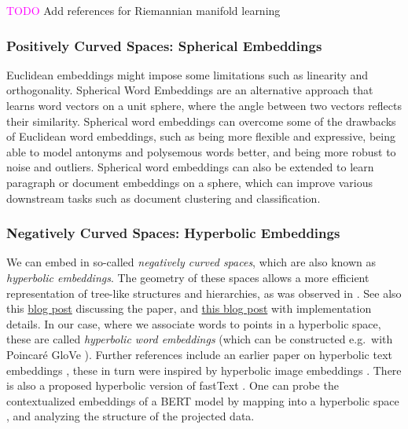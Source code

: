\documentclass[11pt, a4paper]{amsart}
\begin{document}
\textcolor{magenta}{TODO} Add references for Riemannian manifold learning

\subsubsection{Positively Curved Spaces: Spherical Embeddings}

Euclidean embeddings might impose some limitations such as linearity and orthogonality.
Spherical Word Embeddings \cite{Meng2019SphericalTE} are an alternative approach that learns word vectors on a unit sphere, where the angle between two vectors reflects their similarity.
Spherical word embeddings can overcome some of the drawbacks of Euclidean word embeddings, such as being more flexible and expressive, being able to model antonyms and polysemous words better, and being more robust to noise and outliers.
Spherical word embeddings can also be extended to learn paragraph or document embeddings on a sphere, which can improve various downstream tasks such as document clustering and classification.

\subsubsection{Negatively Curved Spaces: Hyperbolic Embeddings}

We can embed in so-called \emph{negatively curved spaces}, which are also known as \emph{hyperbolic embeddings}.
The geometry of these spaces allows a more efficient representation of tree-like structures and hierarchies, as was observed in \cite{DBLP:journals/corr/NickelK17}.
See also this \href{https://bjlkeng.github.io/posts/hyperbolic-geometry-and-poincare-embeddings/}{blog post} discussing the paper, and \href{https://rare-technologies.com/implementing-poincare-embeddings/}{this blog post} with implementation details.
In our case, where we associate words to points in a hyperbolic space, these are called \emph{hyperbolic word embeddings} (which can be constructed e.g.\ with Poincar{\'e} GloVe \cite{DBLP:journals/corr/abs-1810-06546}).
Further references include an earlier paper on hyperbolic text embeddings \cite{DBLP:journals/corr/abs-1806-04313},
these in turn were inspired by hyperbolic image embeddings \cite{DBLP:journals/corr/abs-1904-02239}.
There is also a proposed hyperbolic version of fastText \cite{zhu-etal-2020-hypertext}.
One can probe the contextualized embeddings of a BERT model by mapping into a hyperbolic space \cite{DBLP:journals/corr/abs-2104-03869}, and analyzing the structure of the projected data.
\end{document}
